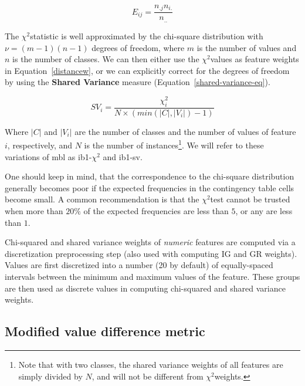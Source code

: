 \documentclass{report}
\newcommand{\chisq}{{$ \chi^2 $}}
\begin{document}
\begin{equation}
E_{ij} = \frac{n_{.j} n_{i.}}{n_{..}}
\label{chisq-expect-eq}
\end{equation}

The \chisq statistic is well approximated by the chi-square
distribution with $\nu = (m-1)(n-1)$ degrees of freedom, where $m$ is
the number of values and $n$ is the number of classes. We can then
either use the \chisq values as feature weights in
Equation~\ref{distancew}, or we can explicitly correct for the degrees
of freedom by using the {\bf Shared Variance} measure
(Equation~\ref{shared-variance-eq}).

\begin{equation}
SV_{i} = \frac{ \chi^2_{i}}{N \times ( min(|C|,|V_{i}|)-1 ) }
\label{shared-variance-eq}
\end{equation}

Where $|C|$ and $|V_{i}|$ are the number of classes and the number of
values of feature $i$, respectively, and $N$ is the number of
instances\footnote{Note that with two classes, the shared variance
weights of all features are simply divided by $N$, and will not be
different from \chisq weights.}. We will refer to these
variations of {\sc mbl} as {\sc ib1-\chisq} and {\sc ib1-sv}.

One should keep in mind, that the correspondence to the chi-square
distribution generally becomes poor if the expected frequencies in the
contingency table cells become small. A common recommendation is that
the \chisq test cannot be trusted when more than $20\%$ of the
expected frequencies are less than $5$, or any are less than $1$.

Chi-squared and shared variance weights of {\em numeric}\/ features are
computed via a discretization preprocessing step (also used with
computing IG and GR weights). Values are first discretized into a
number (20 by default) of equally-spaced intervals between the
minimum and maximum values of the feature. These groups are then used
as discrete values in computing chi-squared and shared variance weights.

\subsection{Modified value difference metric}
\label{mvdm}
\end{document}
